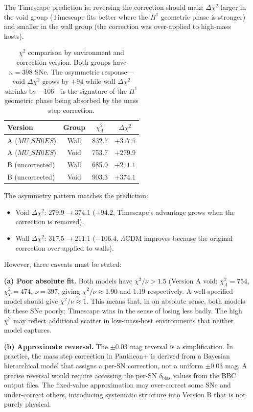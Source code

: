 \documentclass[11pt]{article}
\begin{document}
The Timescape prediction is: reversing the correction should make
$\Delta\chi^2$ larger in the void group (Timescape fits better where
the $H^1$ geometric phase is stronger) and smaller in the wall group
(the correction was over-applied to high-mass hosts).

\begin{table}[h]
\centering
\begin{tabular}{lccc}
\toprule
Version & Group & $\chi^2_\Lambda$ & $\Delta\chi^2$ \\
\midrule
A ($MU\_SH0ES$) & Wall  & 832.7 & $+317.5$ \\
A ($MU\_SH0ES$) & Void  & 753.7 & $+279.9$ \\
\midrule
B (uncorrected) & Wall  & 685.0 & $+211.1$ \\
B (uncorrected) & Void  & 903.3 & $+374.1$ \\
\bottomrule
\end{tabular}
\caption{$\chi^2$ comparison by environment and correction version.
Both groups have $n=398$ SNe. The asymmetric response---void $\Delta\chi^2$
grows by $+94$ while wall $\Delta\chi^2$ shrinks by $-106$---is the
signature of the $H^1$ geometric phase being absorbed by the mass step
correction.}
\label{tab:mvp-result}
\end{table}

The asymmetry pattern matches the prediction:
\begin{itemize}
  \item Void $\Delta\chi^2$: $279.9 \to 374.1$ ($+94.2$, Timescape's
    advantage grows when the correction is removed).
  \item Wall $\Delta\chi^2$: $317.5 \to 211.1$ ($-106.4$, $\Lambda$CDM
    improves because the original correction over-applied to walls).
\end{itemize}

However, three caveats must be stated:

\textbf{(a) Poor absolute fit.} Both models have $\chi^2/\nu > 1.5$
(Version A void: $\chi^2_\Lambda = 754$, $\chi^2_T = 474$, $\nu = 397$,
giving $\chi^2/\nu \approx 1.90$ and $1.19$ respectively.
A well-specified model should give $\chi^2/\nu \approx 1$. This means
that, in an absolute sense, both models fit these SNe poorly;
Timescape wins in the sense of losing less badly. The high $\chi^2$
may reflect additional scatter in low-mass-host environments that
neither model captures.

\textbf{(b) Approximate reversal.} The $\pm 0.03$ mag reversal is a
simplification. In practice, the mass step correction in Pantheon+
is derived from a Bayesian hierarchical model that assigns a
per-SN correction, not a uniform $\pm 0.03$ mag. A precise reversal
would require accessing the per-SN $\delta_{\text{bias}}$ values
from the BBC output files. The fixed-value approximation may
over-correct some SNe and under-correct others, introducing
systematic structure into Version B that is not purely physical.
\end{document}
